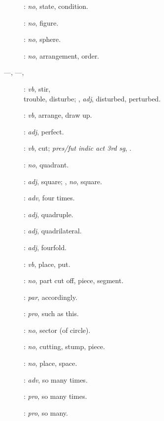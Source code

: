 {\begin{description}
\item[]: {\em no}, state, condition.
\item[]: {\em no}, figure.
\item[]: {\em no}, sphere.
\item[]: {\em no}, arrangement, order.
\item[ ---, ---, ]: {\em vb}, stir,\\ trouble, disturbe; , {\em adj}, disturbed, perturbed.
\item[]: {\em vb},
arrange, draw up.
\item[]: {\em adj}, perfect.
\item[]:
{\em vb}, cut; {\em pres/fut indic act 3rd sg}, .
\item[]: {\em no}, quadrant.
\item[]: {\em adj}, square; ,
{\em no}, square.
\item[]: {\em adv}, four times.
\item[]: {\em adj}, quadruple.
\item[]: {\em adj}, quadrilateral.
\item[]: {\em adj}, fourfold.
\item[]: {\em vb}, place, put.
\item[]: {\em no}, part cut off, piece, segment.
\item[]: {\em par}, accordingly.
\item[]: {\em pro}, such as this.
\item[]: {\em no}, sector (of circle).
\item[]: {\em no}, cutting, stump, piece.
\item[]: {\em no}, place, space.
\item[]: {\em adv}, so many times.
\item[]: {\em pro}, so many times.
\item[]: {\em pro}, so many.

\end{description}}
